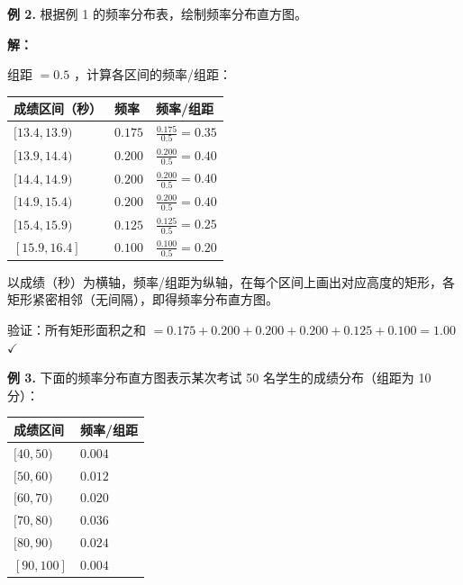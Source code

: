 \begin{workedexamples}


\textbf{例 2.} 根据例 1 的频率分布表，绘制频率分布直方图。

\textbf{解：}

组距 $= 0.5$ ，计算各区间的频率/组距：

\begin{center}
\begin{tabular}{lll}
\toprule
成绩区间（秒） & 频率 & 频率/组距 \\
\midrule
$[13.4, 13.9)$ & $0.175$ & $\frac{0.175}{0.5} = 0.35$ \\
$[13.9, 14.4)$ & $0.200$ & $\frac{0.200}{0.5} = 0.40$ \\
$[14.4, 14.9)$ & $0.200$ & $\frac{0.200}{0.5} = 0.40$ \\
$[14.9, 15.4)$ & $0.200$ & $\frac{0.200}{0.5} = 0.40$ \\
$[15.4, 15.9)$ & $0.125$ & $\frac{0.125}{0.5} = 0.25$ \\
$[15.9, 16.4]$ & $0.100$ & $\frac{0.100}{0.5} = 0.20$ \\
\bottomrule
\end{tabular}
\end{center}


以成绩（秒）为横轴，频率/组距为纵轴，在每个区间上画出对应高度的矩形，各矩形紧密相邻（无间隔），即得频率分布直方图。

验证：所有矩形面积之和 $= 0.175 + 0.200 + 0.200 + 0.200 + 0.125 + 0.100 = 1.00$ $\checkmark$

\begin{center}
\label{fig:freq-hist-sprint}
\end{center}

\textbf{例 3.} 下面的频率分布直方图表示某次考试 50 名学生的成绩分布（组距为 10 分）：

\begin{center}
\begin{tabular}{ll}
\toprule
成绩区间 & 频率/组距 \\
\midrule
$[40, 50)$ & $0.004$ \\
$[50, 60)$ & $0.012$ \\
$[60, 70)$ & $0.020$ \\
$[70, 80)$ & $0.036$ \\
$[80, 90)$ & $0.024$ \\
$[90, 100]$ & $0.004$ \\
\bottomrule
\end{tabular}
\end{center}


\end{workedexamples}
